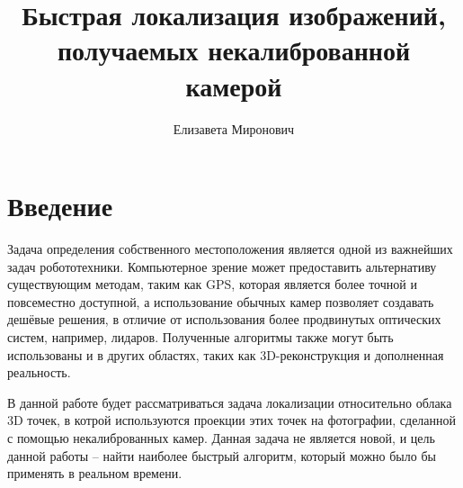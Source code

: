 \documentclass{article}
\title{Быстрая локализация изображений, получаемых некалиброванной камерой}
\author{Елизавета Миронович}
\begin{document}
\maketitle

\section{Введение}

Задача определения собственного местоположения является одной из важнейших задач робототехники.
Компьютерное зрение может предоставить альтернативу существующим методам, таким как GPS, которая является более точной и повсеместно доступной, а использование обычных камер позволяет создавать дешёвые решения, в отличие от использования более продвинутых оптических систем, например, лидаров.
Полученные алгоритмы также могут быть использованы и в других областях, таких как 3D-реконструкция и дополненная реальность.

В данной работе будет рассматриваться задача локализации относительно облака 3D точек, в котрой используются проекции этих точек на фотографии, сделанной с помощью некалиброванных камер.
Данная задача не является новой, и цель данной работы -- найти наиболее быстрый алгоритм, который можно было бы применять в реальном времени.
\end{document}
